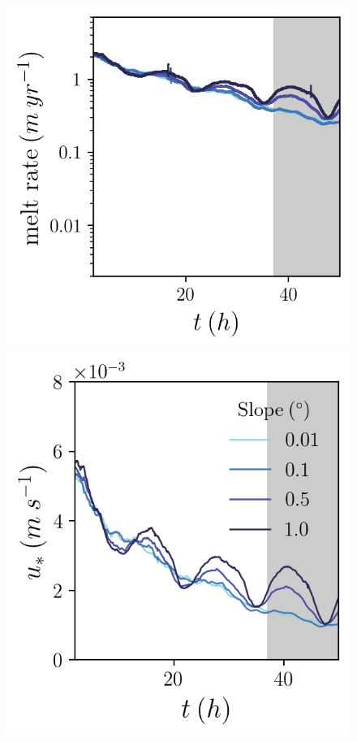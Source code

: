 \documentclass[draft]{styles/agujournal2019}
\begin{document}
\begin{figure}[h!]
\begin{minipage}{0.33\textwidth}
    \end{minipage}%
    \begin{minipage}{0.33\textwidth}
        \includegraphics[trim={0 0 0 0},clip,width=\textwidth]{Figures/melt_cmp_dslope_t.png}
    \end{minipage}%
    \begin{minipage}{0.33\textwidth}
        \includegraphics[trim={0 0 0 0},clip,width=\textwidth]{Figures/us_cmp_dslope_t.png}

\end{minipage}
\end{figure}
\end{document}
